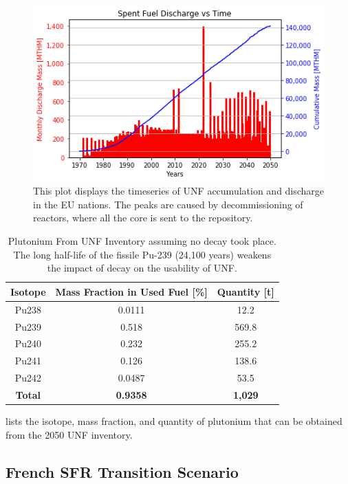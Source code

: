 \begin{figure}[htbp!]
	\begin{center}
			\includegraphics[scale=0.7]{./images/eu_future/snf_discharge.png}
	\end{center}
	\caption{This plot displays the timeseries of \gls{UNF} accumulation and discharge in the \gls{EU} nations.
			 The peaks are caused by decommissioning of reactors, where all the core is sent to the repository.}
	\label{fig:eu_snf}
\end{figure}
\FloatBarrier


\begin{table}[h]
	\centering
	\begin{tabular}{ccc}
		\hline
		\textbf{Isotope} & \textbf{Mass Fraction in Used Fuel [\%]} & \textbf{Quantity [t]} \\ \hline
		Pu238 & 0.0111 & 12.2 \\ 
		Pu239 & 0.518 & 569.8 \\ 
		Pu240 & 0.232 & 255.2 \\ 
		Pu241 & 0.126 & 138.6 \\ 
		Pu242 & 0.0487 & 53.5 \\ \hline
		\textbf{Total} & \textbf{0.9358} & \textbf{1,029} \\ \hline
	\end{tabular}
	\caption{Plutonium From \gls{UNF} Inventory assuming no decay
			 took place. The long half-life of the fissile Pu-239 (24,100 years)
			 weakens the impact of decay on the usability of \gls{UNF}.}
	\label{tab:pu}
\end{table}


 lists the isotope, mass fraction,
and quantity of plutonium that can be obtained from the 2050 \gls{UNF} inventory.


\subsection{French \gls{SFR} Transition Scenario}

